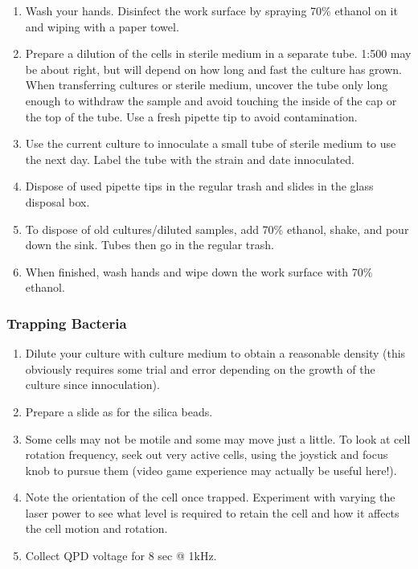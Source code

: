 \documentclass{../lab}
\begin{document}
\begin{enumerate}
    \item Wash your hands. Disinfect the work surface by spraying 70\% ethanol on it and wiping with a paper towel.

    \item Prepare a dilution of the cells in sterile medium in a separate tube. 1:500 may be about right, but will depend on how long and fast the culture has grown. When transferring cultures or sterile medium, uncover the tube only long enough to withdraw the sample and avoid touching the inside of the cap or the top of the tube. Use a fresh pipette tip to avoid contamination.

    \item Use the current culture to innoculate a small tube of sterile medium to use the next day. Label the tube with the strain and date innoculated.

    \item Dispose of used pipette tips in the regular trash and slides in the glass disposal box.

    \item To dispose of old cultures/diluted samples, add 70\% ethanol, shake, and pour down the sink. Tubes then go in the regular trash.

    \item When finished, wash hands and wipe down the work surface with 70\% ethanol.

\end{enumerate}

\subsubsection{Trapping Bacteria}

\begin{enumerate}
    \item Dilute your culture with culture medium to obtain a reasonable density (this obviously requires some trial and error depending on the growth of the culture since innoculation).

    \item Prepare a slide as for the silica beads.

    \item Some cells may not be motile and some may move just a little. To look at cell rotation frequency, seek out very active cells, using the joystick and focus knob to pursue them (video game experience may actually be useful here!).

    \item Note the orientation of the cell once trapped. Experiment with varying the laser power to see what level is required to retain the cell and how it affects the cell motion and rotation.

    \item Collect QPD voltage for 8 sec @ 1kHz.

\end{enumerate}
\end{document}
